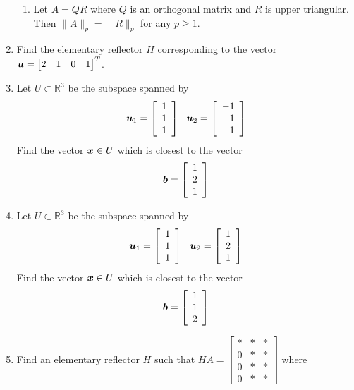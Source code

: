 \begin{enumerate}[leftmargin=*]
\begin{enumerate}
\item Let $A=QR$ where $Q$ is an orthogonal matrix and $R$ is upper triangular. Then $\| A \|_p = \| R \|_p$ for any $p \geq 1$.
\end{enumerate}
\item Find the elementary reflector $H$ corresponding to the vector $\boldsymbol{u} = \begin{bmatrix} 2 & 1 & 0 & 1 \end{bmatrix}^T$.
\item Let $U \subset \mathbb{R}^3$ be the subspace spanned by
$$
\boldsymbol{u}_1 = \left[ \begin{array}{r} 1 \\ 1 \\ 1 \end{array} \right]
\ \
\boldsymbol{u}_2 = \left[ \begin{array}{r} -1 \\ 1 \\ 1 \end{array} \right]
$$
Find the vector $\boldsymbol{x} \in U$ which is closest to the vector
$$
\boldsymbol{b} = \left[ \begin{array}{r} 1 \\ 2 \\ 1 \end{array} \right]
$$
\item Let $U \subset \mathbb{R}^3$ be the subspace spanned by
$$
\boldsymbol{u}_1 = \left[ \begin{array}{r} 1 \\ 1 \\ 1 \end{array} \right]
\ \
\boldsymbol{u}_2 = \left[ \begin{array}{r} 1 \\ 2 \\ 1 \end{array} \right]
$$
Find the vector $\boldsymbol{x} \in U$ which is closest to the vector
$$
\boldsymbol{b} = \left[ \begin{array}{r} 1 \\ 1 \\ 2 \end{array} \right]
$$
\item Find an elementary reflector $H$ such that $\displaystyle HA = \displaystyle \begin{bmatrix} * & * & * \\ 0 & * & * \\ 0 & * & * \\ 0 & * & * \end{bmatrix}$ where
\begin{enumerate}

\end{enumerate}
\end{enumerate}
